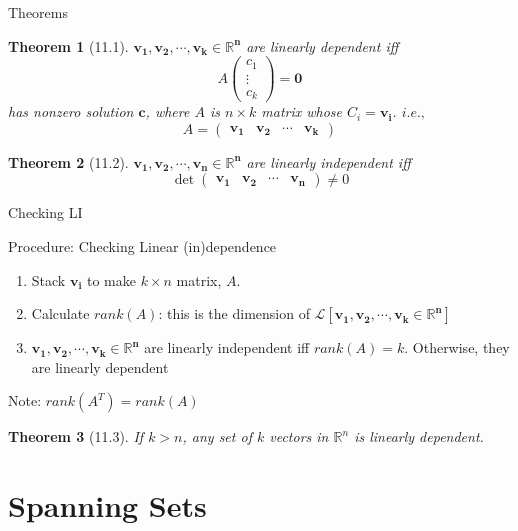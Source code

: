 \documentclass[a4paper,11pt]{article}
\newtheorem{thm}{Theorem}
\begin{document}
\begin{frame}[t]{Theorems}
	\begin{thm}
		[11.1] $\mathbf{v_1,v_2,\cdots,v_k\in\mathbb{R}^n}$ are linearly dependent iff\[
			A \begin{pmatrix}
				c_1 \\
				\vdots\\
				c_k
			\end{pmatrix} = \mathbf{0}
		\] has nonzero solution $\mathbf{c}$, where $A$ is $n\times k$ matrix whose $C_i = \mathbf{v_i}$. $i.e.,$\[
			A = \begin{pmatrix}
				\mathbf{v_1} & \mathbf{v_2} & \cdots & \mathbf{v_k}
			\end{pmatrix}
		\]
	\end{thm}
	\begin{thm}
		[11.2] $\mathbf{v_1,v_2,\cdots,v_n\in\mathbb{R}^n}$ are linearly independent iff \[
			\det\begin{pmatrix}
				\mathbf{v_1} & \mathbf{v_2} & \cdots & \mathbf{v_n}
			\end{pmatrix} \neq 0
		\]
	\end{thm}

\end{frame}

\begin{frame}[t]{Checking LI}
	\begin{block}
		{Procedure: Checking Linear (in)dependence}
		\begin{enumerate}
			\item Stack $\mathbf{v_i}$ to make $k\times n$ matrix, $A$. 
			\item Calculate $rank(A)$: this is the dimension of $\mathcal{L}[\mathbf{v_1,v_2,\cdots,v_k\in\mathbb{R}^n}]$
			\item $\mathbf{v_1,v_2,\cdots,v_k\in\mathbb{R}^n}$ are linearly independent iff $rank(A)=k$. Otherwise, they are linearly dependent
		\end{enumerate}
	\end{block}
	Note: $rank(A^T) = rank(A)$
	\begin{thm}
		[11.3] If $k>n$, any set of $k$ vectors in $\mathbb{R}^n$ is linearly dependent.
	\end{thm}
\end{frame}

\section{Spanning Sets} %
\label{sec:spanning_sets}
\end{document}
